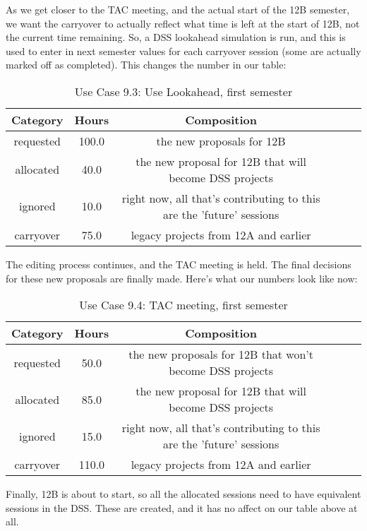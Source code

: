 \documentclass{article}
\begin{document}
As we get closer to the TAC meeting, and the actual start of the 12B semester, we want the carryover to actually reflect what time is left at the start of 12B, not the current time remaining. So, a DSS lookahead simulation is run, and this is used to enter in next semester values for each carryover session (some are actually marked off as completed). This changes the number in our table:

\begin{table}
{\footnotesize
\caption{Use Case 9.3: Use Lookahead, first semester\label{tab:time}}
\begin{tabular*}{1.05\textwidth}{@{\extracolsep{\fill}}cccccc}
\hline \hline
{\bf Category} & {\bf Hours} & {\bf Composition}\\
\hline
requested & 100.0 & the new proposals for 12B\\
allocated & 40.0 & the new proposal for 12B that will become DSS projects\\
ignored & 10.0 & right now, all that's contributing to this are the 'future' sessions\\
carryover & 75.0 & legacy projects from 12A and earlier\\
\hline \hline
\end{tabular*}
}
\end{table}

The editing process continues, and the TAC meeting is held. The final decisions for these new proposals are finally made. Here's what our numbers look like now:

\begin{table}
{\footnotesize
\caption{Use Case 9.4: TAC meeting, first semester\label{tab:time}}
\begin{tabular*}{1.05\textwidth}{@{\extracolsep{\fill}}cccccc}
\hline \hline
{\bf Category} & {\bf Hours} & {\bf Composition}\\
\hline
requested & 50.0 & the new proposals for 12B that won't become DSS projects\\
allocated & 85.0 & the new proposal for 12B that will become DSS projects\\
ignored & 15.0 & right now, all that's contributing to this are the 'future' sessions\\
carryover & 110.0 & legacy projects from 12A and earlier\\
\hline \hline
\end{tabular*}
}
\end{table}

Finally, 12B is about to start, so all the allocated sessions need to have equivalent sessions in the DSS. These are created, and it has no affect on our table above at all.
\end{document}
